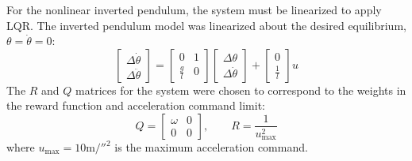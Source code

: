 %
For the nonlinear inverted pendulum, the system must be linearized to apply LQR. The inverted pendulum model was linearized about the desired equilibrium, $\theta=\dot{\theta}=0$:
%
\begin{equation}
\left [
\begin{array}{c}
\Delta \dot{\theta}\\
\Delta \ddot{\theta}
\end{array}
\right ] = \left [
\begin{array}{cc}
0 & 1 \\
\frac{g}{l} & 0
\end{array}
\right ] \left [
\begin{array}{c}
\Delta \theta \\
\Delta \dot{\theta}
\end{array}
\right ] + \left[
\begin{array}{c}
0\\
\frac{1}{l}
\end{array}
\right ] u
\end{equation}
%
The $R$ and $Q$ matrices for the system were chosen to correspond to the weights in the reward function and acceleration command limit:
%
\begin{equation}
Q = \left[
\begin{array}{cc}
\omega & 0 \\
0 & 0
\end{array}
\right], \quad\quad R = \frac{1}{u_{\text{max}}^2}
\end{equation}
%
where $u_{\text{max}}=10\si{\meter\per{\second^2}}$ is the maximum acceleration command.

